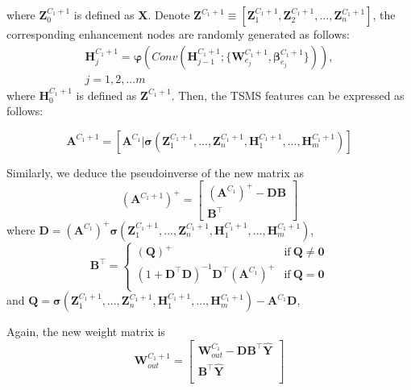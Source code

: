 \documentclass[lettersize,journal]{IEEEtran}
\begin{document}
where $\bm{Z}_{0}^{C_1+1}$ is defined as $\bm{X}$. Denote $\bm{Z}^{C_1+1}\equiv[\bm{Z}_{1}^{C_1+1},\bm{Z}_{2}^{C_1+1},...,\bm{Z}_{n}^{C_1+1}]$, the corresponding enhancement nodes are randomly generated as follows:
\begin{multline}
\label{FeaIncre:H_j}
    \bm{H}_{j}^{C_1+1} = \bm{\varphi} (Conv(\bm{H}_{j-1}^{C_1+1}; \{ \bm{W}_{e_j}^{C_1+1}, \bm{\beta}_{e_j}^{C_1+1} \})),\\
    j=1,2,...m
\end{multline}
where $\bm{H}_{0}^{C_1+1}$ is defined as $\bm{Z}^{C_1+1}$. Then, the TSMS features can be expressed as follows:
\begin{small}
\begin{equation}
    \label{FeaIncre:A_new}
    \bm{A}^{C_1+1}= [\bm{A}^{C_1}|\bm{\sigma}(\bm{Z}_{1}^{C_1+1},...,\bm{Z}_{n}^{C_1+1},\bm{H}_{1}^{C_1+1},...,\bm{H}_{m}^{C_1+1})]
\end{equation}
\end{small}
Similarly, we deduce the pseudoinverse of the new matrix as 
\begin{equation}
    \label{FeaIncre:PI}
    (\bm{A}^{C_1+1})^{+}=\begin{bmatrix}
    (\bm{A}^{C_1})^{+}-\bm{DB}\\
    \bm{B}^{\top}
    \end{bmatrix}
\end{equation}
where $\bm{D}=(\bm{A}^{C_1})^{+}\bm{\sigma}(\bm{Z}_{1}^{C_1+1},...,\bm{Z}_{n}^{C_1+1},\bm{H}_{1}^{C_1+1},...,\bm{H}_{m}^{C_1+1})$,
\begin{equation}
    \label{FeaIncre:BT}
    \bm{B}^{\top}=
    \begin{cases}
    (\bm{Q})^{+} &{\text{if}\ \bm{Q} \ne \bm{0}}\\
    (1+\bm{D}^{\top}\bm{D})^{-1}\bm{D}^{\top}(\bm{A}^{C_1})^{+} &{\text{if}\ \bm{Q}=\bm{0}}\\
    \end{cases}
\end{equation}
and $\bm{Q}=\bm{\sigma}(\bm{Z}_{1}^{C_1+1},...,\bm{Z}_{n}^{C_1+1},\bm{H}_{1}^{C_1+1},...,\bm{H}_{m}^{C_1+1})-\bm{A}^{C_1} \bm{D}$,

Again, the new weight matrix is 
\begin{equation}
    \label{FeaIncre:W_out}
    \bm{W}_{out}^{C_1+1}=
    \begin{bmatrix}
    \bm{W}_{out}^{C_1}-\bm{DB}^{\top}\hat{\bm{Y}}\\
    \bm{B}^{\top}\hat{\bm{Y}}\\
    \end{bmatrix}
\end{equation}
\end{document}
